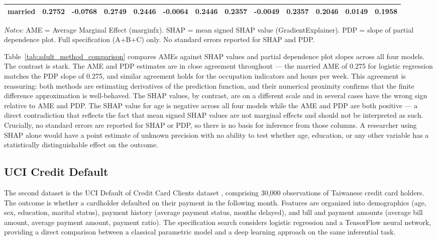 \documentclass[12pt]{article}
\begin{document}
\begin{table}
\begin{threeparttable}
\begin{tabular}{lrrrrrrrrrrrr}
				married & 0.2752 & -0.0768 & 0.2749 & 0.2446 & -0.0064 & 0.2446 & 0.2357 & -0.0049 & 0.2357 & 0.2046 & 0.0149 & 0.1958 \\
				\bottomrule
			\end{tabular}
			\begin{tablenotes}
				\footnotesize
				\item \textit{Notes:} AME = Average Marginal Effect (marginfx). SHAP = mean signed SHAP value (GradientExplainer). PDP = slope of partial dependence plot. Full specification (A+B+C) only. No standard errors reported for SHAP and PDP.
			\end{tablenotes}
		\end{threeparttable}
	\end{table}
	
	Table~\ref{tab:adult_method_comparison} compares AMEs against SHAP values and partial dependence plot slopes across all four models. The contrast is stark. The AME and PDP estimates are in close agreement throughout --- the married AME of 0.275 for logistic regression matches the PDP slope of 0.275, and similar agreement holds for the occupation indicators and hours per week. This agreement is reassuring: both methods are estimating derivatives of the prediction function, and their numerical proximity confirms that the finite difference approximation is well-behaved. The SHAP values, by contrast, are on a different scale and in several cases have the wrong sign relative to AME and PDP. The SHAP value for age is negative across all four models while the AME and PDP are both positive --- a direct contradiction that reflects the fact that mean signed SHAP values are not marginal effects and should not be interpreted as such. Crucially, no standard errors are reported for SHAP or PDP, so there is no basis for inference from those columns. A researcher using SHAP alone would have a point estimate of unknown precision with no ability to test whether age, education, or any other variable has a statistically distinguishable effect on the outcome.
	
	\subsection{UCI Credit Default}
	
	The second dataset is the UCI Default of Credit Card Clients dataset \citep{yeh2009, UCI}, comprising 30,000 observations of Taiwanese credit card holders. The outcome is whether a cardholder defaulted on their payment in the following month. Features are organized into demographics (age, sex, education, marital status), payment history (average payment status, months delayed), and bill and payment amounts (average bill amount, average payment amount, payment ratio). The specification search considers logistic regression and a TensorFlow neural network, providing a direct comparison between a classical parametric model and a deep learning approach on the same inferential task.
	
\end{document}
